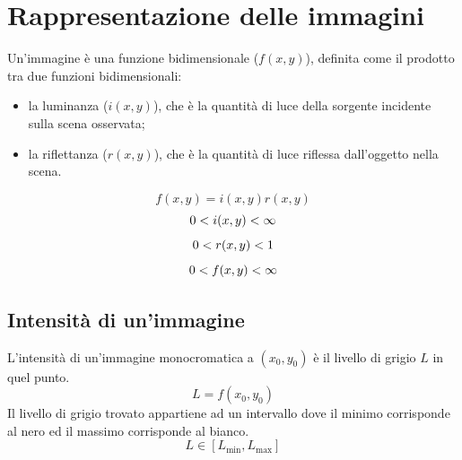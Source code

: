 \section{Rappresentazione delle immagini}
Un'immagine è una funzione bidimensionale ($f(x,y)$), definita come il prodotto tra due funzioni bidimensionali:
\begin{itemize}
    \item la luminanza ($i(x,y)$), che è la quantità di luce della sorgente incidente sulla scena osservata;
    \item la riflettanza ($r(x,y)$), che è la quantità di luce riflessa dall'oggetto nella scena.
\end{itemize}
\begin{equation*}
    f(x,y)=i(x,y)r(x,y)
    \label{eq:f}
\end{equation*}
\begin{equation*}
    0 < i(x,y) < \infty \\
    \label{eq:Luminanza}
\end{equation*}
\begin{equation*}
    0 < r(x,y) < 1 \\
    \label{eq:Riflettanza}
\end{equation*}
\begin{equation*}
    0 < f(x,y) < \infty \\
    \label{eq:Immagine}
\end{equation*}
\subsection{Intensità di un'immagine}
L'intensità di un'immagine monocromatica a $(x_0,y_0)$ è il livello di grigio $L$ in quel punto.
\begin{equation*}
    L=f(x_0,y_0)
    \label{eq:livello di grigio}
\end{equation*}
Il livello di grigio trovato appartiene ad un intervallo dove il minimo corrisponde al nero ed il massimo corrisponde al bianco.
\begin{equation*}
    L \in [L_{\text{min}},L_{\text{max}}]
    \label{eq:intervallo}
\end{equation*}
